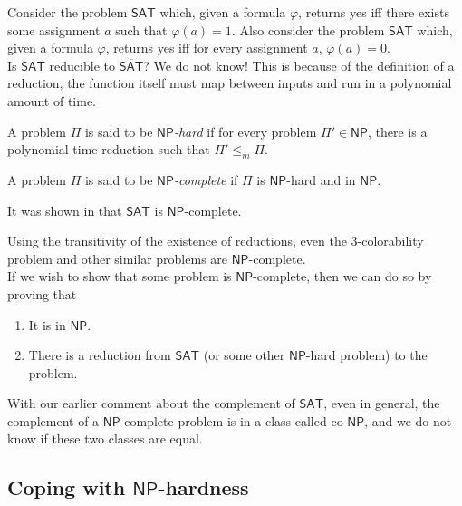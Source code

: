	Consider the problem $\mathsf{SAT}$ which, given a formula $\varphi$, returns yes iff there exists some assignment $a$ such that $\varphi(a) = 1$. Also consider the problem $\overline{\mathsf{SAT}}$ which, given a formula $\varphi$, returns yes iff for every assignment $a$, $\varphi(a) = 0$. \\
	Is $\mathsf{SAT}$ reducible to $\overline{\mathsf{SAT}}$? We do not know! This is because of the definition of a reduction, the function itself must map between inputs and run in a polynomial amount of time.

	\begin{fdef}
		A problem $\mathsf{\Pi}$ is said to be \textit{$\mathsf{NP}$-hard} if for every problem $\mathsf{\Pi}' \in \mathsf{NP}$, there is a polynomial time reduction such that $\mathsf{\Pi}' \leq_m \mathsf{\Pi}$.
	\end{fdef}

	\begin{fdef}
		A problem $\mathsf{\Pi}$ is said to be \textit{$\mathsf{NP}$-complete} if $\mathsf{\Pi}$ is $\mathsf{NP}$-hard and in $\mathsf{NP}$.
	\end{fdef}

	It was shown in \cite{cookSAT,levinSAT} that $\mathsf{SAT}$ is $\mathsf{NP}$-complete.

	Using the transitivity of the existence of reductions, even the $3$-colorability problem and other similar problems are $\mathsf{NP}$-complete.\\
	If we wish to show that some problem is $\mathsf{NP}$-complete, then we can do so by proving that
	\begin{enumerate}
		\item It is in $\mathsf{NP}$.
		\item There is a reduction from $\mathsf{SAT}$ (or some other $\mathsf{NP}$-hard problem) to the problem.
	\end{enumerate}

	With our earlier comment about the complement of $\mathsf{SAT}$, even in general, the complement of a $\mathsf{NP}$-complete problem is in a class called co-$\mathsf{NP}$, and we do not know if these two classes are equal.

\subsection{Coping with \texorpdfstring{$\mathsf{NP}$}{NP}-hardness}

